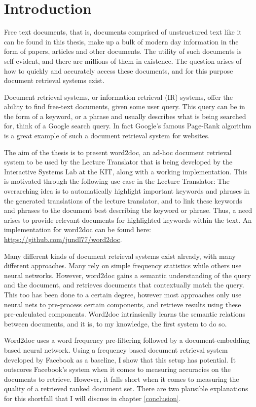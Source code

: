 \chapter{Introduction}

Free text documents, that is, documents comprised of unstructured text like it can be found in this thesis, make up a bulk
of modern day information in the form of papers, articles and other documents. The utility of such documents is self-evident, and
there are millions of them in existence. The question arises of how to quickly and accurately access these documents, and for this
purpose document retrieval systems exist.

Document retrieval systems, or information retrieval (IR) systems, offer the ability to find free-text documents, given some user query.
This query can be in the form of a keyword, or a phrase and usually describes what is being searched for, think of a Google search
query. In fact Google's famous Page-Rank algorithm is a great example of such a document retrieval system for websites.

The aim of the thesis is to present word2doc, an ad-hoc document retrieval system to be used by the Lecture Translator
\citep{mller2016} that is being developed by the Interactive Systems Lab at the KIT, along with a working implementation.
This is motivated through the following use-case in the Lecture Translator: The overarching idea is to automatically highlight
important keywords and phrases in the generated translations of the lecture translator, and to link these keywords and phrases to
the document best describing the keyword or phrase. Thus, a need arises to provide relevant documents for highlighted keywords within
the text. An implementation for word2doc can be found here: \url{https://github.com/jundl77/word2doc}.

Many different kinds of document retrieval systems exist already, with many different approaches. Many rely on simple frequency
statistics while others use neural networks. However, word2doc gains a semantic understanding of the query and the
document, and retrieves documents that contextually match the query. This too has been done to a certain degree, however most
approaches only use neural nets to pre-process certain components, and retrieve results using these pre-calculated
components. Word2doc intrinsically learns the semantic relations between documents, and it is, to my knowledge, the first system to
do so.

Word2doc uses a word frequency pre-filtering followed by a document-embedding based neural network. Using a frequency based
document retrieval system developed by Facebook \citep{drqa} as a baseline, I show that this setup has potential. It outscores
Facebook's system when it comes to measuring accuracies on the documents to retrieve. However, it falls short when it comes to
measuring the quality of a retrieved ranked document set. There are two plausible explanations for this shortfall that I will
discuss in chapter \ref{conclusion}.

